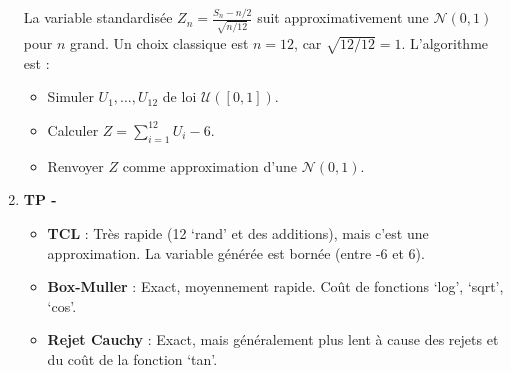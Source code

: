 \documentclass[solutions]{exercices}
\begin{document}
\begin{solution}
\begin{enumerate}
    La variable standardisée $Z_n = \frac{S_n - n/2}{\sqrt{n/12}}$ suit approximativement une $\mathcal{N}(0,1)$ pour $n$ grand.
    Un choix classique est $n=12$, car $\sqrt{12/12}=1$. L'algorithme est :
    \begin{itemize}
        \item Simuler $U_1, \dots, U_{12}$ de loi $\mathcal{U}([0,1])$.
        \item Calculer $Z = \sum_{i=1}^{12} U_i - 6$.
        \item Renvoyer $Z$ comme approximation d'une $\mathcal{N}(0,1)$.
    \end{itemize}
    \item \textbf{TP -}
    \begin{itemize}
        \item \textbf{TCL} : Très rapide (12 `rand' et des additions), mais c'est une approximation. La variable générée est bornée (entre -6 et 6).
        \item \textbf{Box-Muller} : Exact, moyennement rapide. Coût de fonctions `log', `sqrt', `cos'.
        \item \textbf{Rejet Cauchy} : Exact, mais généralement plus lent à cause des rejets et du coût de la fonction `tan'.
    \end{itemize}
\end{enumerate}
\end{solution}
\end{document}
